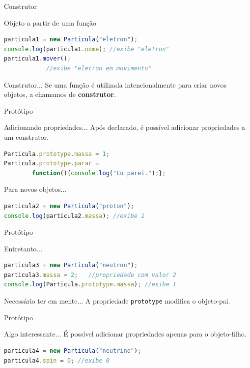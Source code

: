 \documentclass[xcolor=dvipsnames,table]{beamer}
\begin{document}
\begin{frame}[fragile]{Construtor}
	\begin{block}{Objeto a partir de uma função}
		\begin{lstlisting}[language=JavaScript]
particula1 = new Particula("eletron");
console.log(particula1.nome); //exibe "eletron"
particula1.mover();	
			//exibe "eletron em movimento"
\end{lstlisting}	
	\end{block}
	\begin{block}{Construtor...}
		Se uma função é utilizada intencionalmente para criar novos objetos, a chamamos de {\bf construtor}.
	\end{block}
\end{frame}

\begin{frame}[fragile]{Protótipo}
	\begin{block}{Adicionando propriedades...}
		Após declarado, é possível adicionar propriedades a um construtor.
		\begin{lstlisting}[language=JavaScript]
Particula.prototype.massa = 1;
Particula.prototype.parar = 
		function(){console.log("Eu parei.");};
\end{lstlisting}	
	\end{block} 
	\begin{block}{Para novos objetos...}
		\begin{lstlisting}[language=JavaScript]
particula2 = new Particula("proton");
console.log(particula2.massa); //exibe 1
\end{lstlisting}	
	\end{block}
\end{frame}

\begin{frame}[fragile]{Protótipo}
	\begin{block}{Entretanto...}
		\begin{lstlisting}[language=JavaScript]
particula3 = new Particula("neutron");
particula3.massa = 2;	//propriedade com valor 2
console.log(Particula.prototype.massa);	//exibe 1
\end{lstlisting}	
	\end{block} 
	\begin{alertblock}{Necessário ter em mente...}
		A propriedade {\tt prototype} modifica o objeto-pai.	
	\end{alertblock}
\end{frame}

\begin{frame}[fragile]{Protótipo}
	\begin{block}{Algo interessante...}
		É possível adicionar propriedades apenas para o objeto-filho.
		\begin{lstlisting}[language=JavaScript]
particula4 = new Particula("neutrino");
particula4.spin = 0; //exibe 0
\end{lstlisting}	
	\end{block}
\end{frame}
\end{document}
